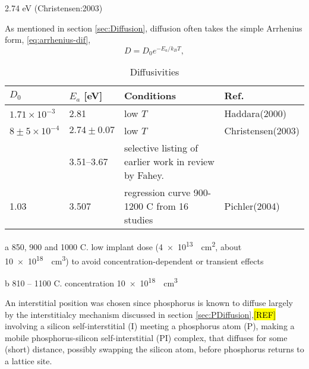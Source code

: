 \documentclass[11pt,bibliography=totoc,index=totoc]{scrbook}   %
\newcommand{\comment}[1]{\hl{#1}}
\begin{document}
2.74 eV (Christensen:2003)

As mentioned in section \ref{sec:Diffusion}, diffusion often takes the simple Arrhenius form, \eqref{eq:arrhenius-dif},
\begin{equation*}
    D = D_0 e^{-E_a/k_BT},
\end{equation*}


\begin{table}[htbp]
  \centering
  \begin{threeparttable}[htbp]
  \begin{tabular}{llll}
      \toprule
        $D_0$ & $E_a$ [eV] & Conditions & Ref. \\
      \midrule
      $1.71\times 10^{-3}$ & 2.81 & low $T$\tnote{a} & Haddara(2000)\cite{Haddara:2000} \\
      $8\pm5\times 10^{-4}$ & $2.74\pm 0.07$ & low $T$\tnote{b} & Christensen(2003)\cite{Christensen:2003} \\
      & 3.51–3.67 & selective listing of earlier work in review by Fahey.\cite[320]{Fahey:1989} \\
      1.03 & 3.507 & regression curve 900-1200 C from 16 studies & Pichler(2004)\cite{Pichler:2004} \\
      \bottomrule
    \end{tabular}
    {\footnotesize
        \begin{tablenotes}
          \item[a] 850, 900 and 1000 C.
            low implant dose (\SI{4e13}{\per\centi\metre\squared}, about \SI{10e18}{\per\centi\metre\cubed}) to 
            avoid concentration-dependent or transient effects
          \item[b] 810 – 1100 C. concentration \SI{10e18}{\per\centi\metre\cubed}
        \end{tablenotes}
    }
  \end{threeparttable}
  \caption{Diffusivities}
  \label{tab:Label}
\end{table}

An interstitial position was chosen since phosphorus is known to diffuse largely by 
the interstitialcy mechanism discussed in section \ref{sec:PDiffusion},\comment{[REF]}
involving a silicon self-interstitial (I) meeting 
a phosphorus atom (P), making a mobile phosphorus-silicon self-interstitial (PI) complex, 
that diffuses for some (short) distance, possibly swapping the silicon atom, before phosphorus 
returns to a lattice site.
\end{document}
